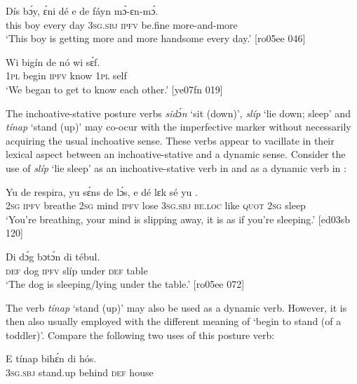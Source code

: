 \ea%
    \label{ex:key:302}
    \gll Dís  bɔ́y,    ɛ́ni    dé  e    de  fáyn  mɔ́-ɛn-mɔ́.\\
this  boy    every  day  \textsc{3sg.sbj}  \textsc{ipfv}  be.fine  more-and-more\\

\glt ‘This boy is getting more and more handsome every day.’ [ro05ee 046]
\z


\ea%
    \label{ex:key:303}
    \gll Wi  bigín  de  nó    wi  sɛ́f.\\
\textsc{1pl}  begin  \textsc{ipfv}  know  \textsc{1pl}  self\\

\glt ‘We began to get to know each other.’ [ye07fn 019]
\z

The inchoative-stative posture verbs \textit{sidɔ́n} ‘sit (down)’, \textit{slíp} ‘lie down; sleep’ and \textit{tínap} ‘stand (up)’ may co-ocur with the imperfective marker without necessarily acquiring the usual inchoative sense. These verbs appear to vacillate in their lexical aspect between an inchoative-stative and a dynamic sense. Consider the use of \textit{slíp} ‘lie sleep’ as an inchoative-stative verb in  and as a dynamic verb in :


\ea%
    \label{ex:key:304}
    \gll Yu  de  respira,  yu  sɛ́ns    de  lɔ́s,  e    dé
lɛk    sé    yu  .\\
\textsc{2sg}  \textsc{ipfv}  breathe  \textsc{2sg}  mind  \textsc{ipfv}  lose  \textsc{3sg.sbj}  \textsc{be.loc}
like    \textsc{quot}    \textsc{2sg}  sleep\\

\glt ‘You’re breathing, your mind is slipping away, it is as if you’re sleeping.’ [ed03sb 120]
\z


\ea%
    \label{ex:key:305}
    \gll Di  dɔ́g      bɔtɔ́n  di  tébul.\\
\textsc{def}  dog  \textsc{ipfv}  slíp  under  \textsc{def}  table\\

\glt ‘The dog is sleeping/lying under the table.’ [ro05ee 072]
\z

The verb \textit{tínap} ‘stand (up)’ may also be used as a dynamic verb. However, it is then also usually employed with the different meaning of ‘begin to stand (of a toddler)’. Compare the following two uses of this posture verb: 


\ea%
    \label{ex:key:306}
    \gll E    tínap  bihɛ́n  di  hós.\\
\textsc{3sg.sbj}  stand.up  behind  \textsc{def}  house\\

